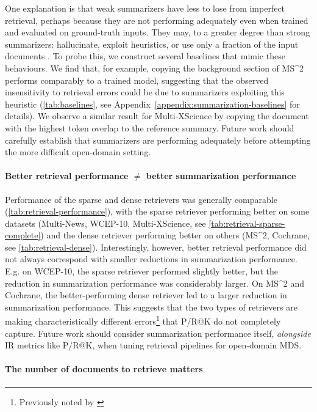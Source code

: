 \documentclass[11pt]{article}
\newcommand\mstoo{{MS\^{}2}\xspace}
\begin{document}
One explanation is that weak summarizers have less to lose from imperfect retrieval, perhaps because they are not performing adequately even when trained and evaluated on ground-truth inputs. They may, to a greater degree than strong summarizers: hallucinate, exploit heuristics, or use only a fraction of the input documents \citep{kryscinski-etal-2019-neural, https://doi.org/10.48550/arxiv.2210.12688}. To probe this, we construct several baselines that mimic these behaviours. We find that, for example, copying the background section of \mstoo performs comparably to a trained model, suggesting that the observed insensitivity to retrieval errors could be due to summarizers exploiting this heuristic (\autoref{tab:baselines}, see Appendix~\ref{appendix:summarization-baselines} for details). We observe a similar result for Multi-XScience by copying the document with the highest token overlap to the reference summary. Future work should carefully establish that summarizers are performing adequately before attempting the more difficult open-domain setting.

\paragraph{Better retrieval performance \(\neq\) better summarization performance}

Performance of the sparse and dense retrievers was generally comparable (\autoref{tab:retrieval-performance}), with the sparse retriever performing better on some datasets (Multi-News, WCEP-10, Multi-XScience, see \autoref{tab:retrieval-sparse-complete}) and the dense retriever performing better on others (\mstoo, Cochrane, see \autoref{tab:retrieval-dense}). Interestingly, however, better retrieval performance did not always correspond with smaller reductions in summarization performance. E.g. on WCEP-10, the sparse retriever performed slightly better, but the reduction in summarization performance was considerably larger. On \mstoo and Cochrane, the better-performing dense retriever led to a larger reduction in summarization performance. This suggests that the two types of retrievers are making characteristically different errors\footnote{Previously noted by \citet{macavaney-etal-2022-abnirml}} that P/R@K do not completely capture. Future work should consider summarization performance itself, \textit{alongside} IR metrics like P/R@K, when tuning retrieval pipelines for open-domain MDS.

\paragraph{The number of documents to retrieve matters} \label{choosing-k}
\end{document}
